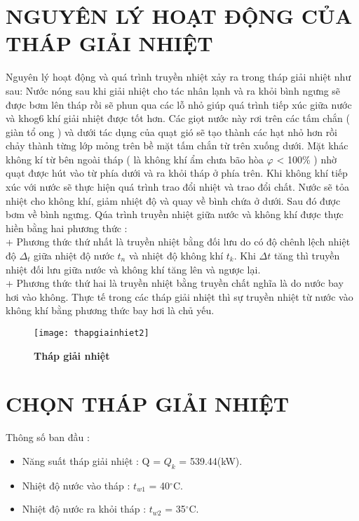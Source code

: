 
\section{NGUYÊN LÝ HOẠT ĐỘNG CỦA THÁP GIẢI NHIỆT}

Nguyên lý hoạt động và quá trình truyền nhiệt xảy ra trong tháp giải nhiệt như sau: Nước nóng sau khi giải nhiệt cho tác nhân lạnh và ra khỏi bình ngưng sẽ được bơm lên tháp rồi sẽ phun qua các lỗ nhỏ giúp quá trình tiếp xúc giữa nước và khog6 khí giải nhiệt được tốt hơn. Các giọt nước này rơi trên các tấm chắn ( giàn tổ ong ) và dưới tác dụng của quạt gió sẽ tạo thành các hạt nhỏ hơn rồi chảy thành từng lớp mỏng trên bề mặt tấm chắn từ trên xuống dưới. Mặt khác không kí từ bên ngoài tháp ( là không khí ẩm chưa bão hòa $\varphi$ < 100\% ) nhờ quạt được hút vào từ phía dưới và ra khỏi tháp ở phía trên. Khi không khí tiếp xúc với nước sẽ thực hiện quá trình trao đổi nhiệt và trao đổi chất. Nước sẽ tỏa nhiệt cho không khí, giảm nhiệt độ và quay về bình chứa ở dưới. Sau đó được bơm về bình ngưng. Qúa trình truyền nhiệt giữa nước và không khí được thực hiền bằng hai phương thức : \\
+ Phương thức thứ nhất là truyền nhiệt bằng đối lưu do có độ chênh lệch nhiệt độ $\Delta_{t}$ giữa nhiệt độ nước $t_{n}$ và nhiệt độ không khí $t_{k}$. Khi $\Delta t$ tăng thì truyền nhiệt đối lưu giữa nước và không khí tăng lên và ngược lại.\\
+ Phương thức thứ hai là truyền nhiệt bằng truyền chất nghĩa là do nước bay hơi vào không. Thực tế trong các tháp giải nhiệt thì sự truyền nhiệt từ nước vào không khí bằng phương thức bay hơi là chủ yếu.\\

\begin{figure}[H]
	\centering
	\texttt{[image: thapgiainhiet2]}
	\caption{\textbf{Tháp giải nhiệt}}
	\label{thapgiainhiet2}
\end{figure}

\section{CHỌN THÁP GIẢI NHIỆT}
Thông số ban đầu :
\begin{itemize}
	\item Năng suất tháp giải nhiệt : Q = $ Q_{k}$ = 539.44(kW).
	\item Nhiệt độ nước vào tháp : $t_{w1}$ = 40$^{\circ}$C.
	\item Nhiệt độ nước ra khỏi tháp : $t_{w2}$ = 35$^{\circ}$C.
\end{itemize}

